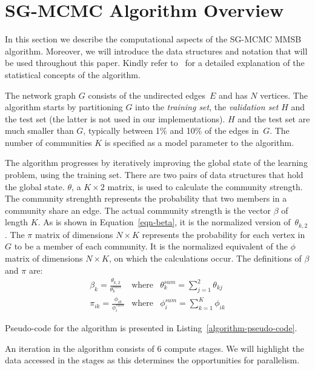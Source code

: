 \section{SG-MCMC Algorithm Overview} 
\label{sec-algorithm}

In this section we describe the computational aspects of the SG-MCMC MMSB
algorithm. Moreover, we will introduce the data structures and notation that
will be used throughout this paper.
%
Kindly refer to~\cite{LiAW15} for a detailed explanation of
the statistical concepts of the algorithm.

The network graph $G$ consists of the undirected edges~$E$ and has $N$ vertices.
The algorithm starts by partitioning $G$ into the \textit{training
set}, the \textit{validation set} $H$ and the test set (the latter is not used
in our implementations). $H$ and the test set
are much smaller than $G$, typically between 1\% and 10\% of the edges
in~$G$.
The number of communities $K$
is specified as a model parameter to the algorithm.

The algorithm progresses by iteratively improving the global state of the learning
problem, using the training set. There are two pairs of data structures that
hold the global state. $\theta$, a $K{\times}2$ matrix, is used to
calculate
the community strength. The community strenghth represents the probability that two members in a community share
an edge. The actual community strength
is the vector $\beta$ of length $K$. As is shown in Equation~\ref{eqn-beta}, it is the
normalized version of~$\theta_{k,2}$.
The $\pi$ matrix of dimensions $N{\times}K$ represents the probability for
each vertex in $G$ to be a member of each community. It is the normalized
equivalent of the $\phi$ matrix of dimensions $N{\times}K$, on which the
calculations occur. The
definitions of $\beta$ and $\pi$ are:
%
\begin{eqnarray}
    \label{eqn-beta}
    \beta_{k} = \frac {\theta_{k,2}} {\theta^{sum}_k} &
    	\textrm{where} & \theta^{sum}_k = \sum_{j=1}^{2} \theta_{kj} \\
    \label{eqn-pi}
    \pi_{ik} = \frac {\phi_{ik}} {\phi^{sum}_i} &
    	\textrm{where} & \phi^{sum}_i = \sum_{k=1}^{K} \phi_{ik}
\end{eqnarray}

Pseudo-code for the algorithm is presented in
Listing~\ref{algorithm-pseudo-code}.

An iteration in the algorithm consists of 6 compute stages.
We will highlight the data accessed in the stages as this
determines the opportunities for parallelism.

